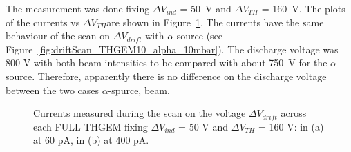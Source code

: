 \documentclass[a4paper, 11 pt]{report}
\newcommand{\Vind}{$\Delta V_{ind}$}
\newcommand{\Vthgem}{$\Delta V_{TH}$}
\newcommand{\Vdrift}{$ \Delta V_{drift}$}
\newcommand{\ibeam}{$I_{beam}$}
\begin{document}
The measurement was done fixing \Vind{} = 50~V and \Vthgem{} = 160~V. 
The plots of the currents vs \Vthgem are shown in Figure~\ref{fig:driftScan_THGEM10_beam_10mbar}.
The currents have the same behaviour of the scan on \Vdrift{} with $\alpha$ source (see Figure~\ref{fig:driftScan_THGEM10_alpha_10mbar}). 
The discharge voltage was 800 V with both beam intensities to be compared with about 750~V for the $\alpha$ source. Therefore, apparently there is no difference on the discharge voltage between the two cases
$\alpha$-spurce, beam.

\begin{figure}[!htb]
	\centering
	\caption{Currents measured during the scan on the voltage \Vdrift{} across each FULL THGEM fixing \Vind{} = 50 V and \Vthgem{} = 160 V: in (a) at 60 pA, in (b) at 400 pA.}
	\label{fig:driftScan_THGEM10_beam_10mbar}
\end{figure}
\end{document}
